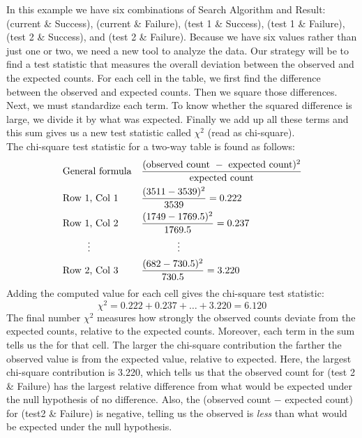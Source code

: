 In this example we have six combinations of Search Algorithm and Result: (current \& Success), (current \& Failure), (test 1 \& Success), (test 1 \& Failure), (test 2 \& Success), and (test 2 \& Failure). Because we have six values rather than just one or two, we need a new tool to analyze the data. Our strategy will be to find a test statistic that measures the overall deviation between the observed and the expected counts. For each cell in the table, we first find the difference between the observed and expected counts.  Then we square those differences.  Next, we must standardize each term.  To know whether the squared difference is large, we divide it by what was expected.  Finally we add up all these terms and this sum gives us a new test statistic called $\chi^2$ (read as chi-square).\\

The chi-square test statistic for a two-way table is found as follows:
\begin{align*}
&\text{General formula}& &\frac{(\text{observed count } - \text{ expected count})^2}{\text{expected count}} \\
&\text{Row 1, Col 1}& &\frac{(3511 - 3539)^2}{3539} = 0.222 \\
&\text{Row 1, Col 2}& &\frac{(1749 - 1769.5)^2}{1769.5} = 0.237 \\
& \hspace{9mm}\vdots & &\hspace{13mm}\vdots \\
&\text{Row 2, Col 3}& &\frac{(682 - 730.5)^2}{730.5} = 3.220
\end{align*}
Adding the computed value for each cell gives the chi-square test statistic:
$$\chi^2 = 0.222 + 0.237 + \dots + 3.220 = 6.120$$
The final number $\chi^2$ measures how strongly the observed counts deviate from the expected counts, relative to the expected counts.  Moreover, each term in the sum tells us the  for that cell.  The larger the chi-square contribution the farther the observed value is from the expected value, relative to expected.  Here, the largest chi-square contribution is 3.220, which tells us that the observed count for (test 2 \& Failure) has the largest relative difference from what would be expected under the null hypothesis of no difference. Also, the (observed count $-$ expected count) for (test2 \& Failure) is negative, telling us the observed is \emph{less} than what would be expected under the null hypothesis.



